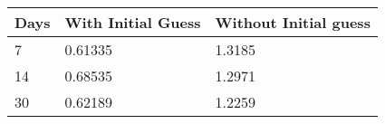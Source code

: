 \begin{tabular}{lll}
Days & With Initial Guess & Without Initial guess \\ 
\hline 
7 & 0.61335 & 1.3185 \\ 
14 & 0.68535 & 1.2971 \\ 
30 & 0.62189 & 1.2259 \\ 
\hline 
\end{tabular}